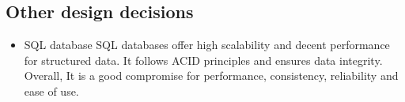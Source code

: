\vspace{1cm}
    
\subsection{Other design decisions}
\begin{itemize}
    \item SQL database
    SQL databases offer high scalability and decent performance for structured data. It follows ACID principles and ensures data integrity. Overall, It is a good compromise for performance, consistency, reliability and ease of use.
\end{itemize}